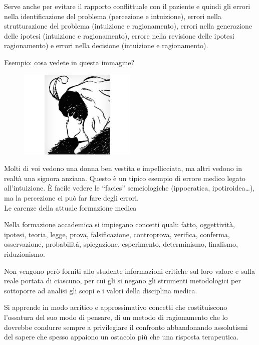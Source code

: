   Serve anche per evitare il rapporto conflittuale con il paziente e
  quindi gli errori nella identificazione del problema (percezione e
  intuizione), errori nella strutturazione del problema (intuizione e
  ragionamento), errori nella generazione delle ipotesi (intuizione e
  ragionamento), errore nella revisione delle ipotesi ragionamento) e
  errori nella decisione (intuizione e ragionamento).
  

  Esempio: cosa vedete in questa immagine?

   \begin{figure}[!ht]
\centering
	\includegraphics[width=0.5\textwidth]{33/image1.jpeg}
	\end{figure}
  
  Molti
  di voi vedono una donna ben vestita e impellicciata, ma altri vedono
  in realtà una signora anziana. Questo è un tipico esempio di errore
  medico legato all'intuizione. È facile vedere le ``facies''
  semeiologiche (ippocratica, ipotiroidea\ldots{}), ma la percezione ci
  può far fare degli errori.\\
  Le carenze della attuale formazione medica

  Nella formazione accademica si impiegano concetti quali: fatto,
  oggettività, ipotesi, teoria, legge, prova, falsificazione,
  controprova, verifica, conferma, osservazione, probabilità,
  spiegazione, esperimento, determinismo, finalismo, riduzionismo.

  Non vengono però forniti allo studente informazioni critiche sul loro
  valore e sulla reale portata di ciascuno, per cui gli si negano gli
  strumenti metodologici per sottoporre ad analisi gli scopi e i valori
  della disciplina medica.

  Si apprende in modo acritico e approssimativo concetti che
  costituiscono l'ossatura del suo modo di pensare, di un metodo di
  ragionamento che lo dovrebbe condurre sempre a privilegiare il
  confronto abbandonando assolutismi del sapere che spesso appaiono un
  ostacolo più che una risposta terapeutica.

